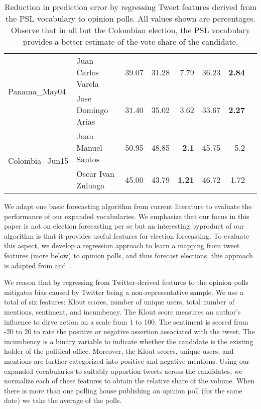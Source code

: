 \begin{table*}[ht]
\begin{tabular}{| l | l | r | r | r | r | r | r |}
		\hline
		\multirow{2}{*}{Panama\_May04} & Juan Carlos Varela & 39.07 &31.28  & 7.79 & 36.23  & \textbf{2.84}\\\cline{2-7}
																	& Jose Domingo Arias  & 31.40 & 35.02  & 3.62  & 33.67  & \textbf{2.27} \\
		\hline 											 
		\multirow{2}{*}{Colombia\_Jun15} & Juan Manuel Santos & 50.95 &48.85  & \textbf{2.1} & 45.75 & 5.2\\\cline{2-7}
																	& Oscar Ivan Zuluaga & 45.00 & 43.79 & \textbf{1.21} & 46.72  & 1.72 \\
		\hline
		\end{tabular}
		\caption{Reduction in prediction error by regressing Tweet
features derived from the PSL vocabulary to opinion polls. All values shown are percentages. Observe that in all but the Colombian election, the PSL vocabulary provides
a better estimate of the vote share of the candidate.}
		\label{table:trackRecord}
	\end{table*}	

We adapt one basic forecasting algorithm from current literature to evaluate the
performance of our expanded vocabularies. We emphasize that our focus in this paper is
not on election forecasting per se but an interesting byproduct of our algorithm is that
it provides useful features for election forecasting.
To evaluate this aspect, we develop
a regression approach
to
learn a mapping
from tweet features (more below) to opinion polls, and thus forecast elections. 
this approach is adapted from \cite{bermingham2011using} and \cite{o2010tweets}.

We reason that by regressing from Twitter-derived features to the opinion polls mitigates bias caused by Twitter being a non-representative sample.
We use a total of six features: Klout scores, number of unique users, total number of mentions, sentiment, and incumbency. The Klout score measures an author's influence to dirve action on a scale from 1 to 100. The sentiment is scored from -20 to 20 to rate the positive or negative assertion associated with the tweet. The incumbency is a binary variable to indicate whether the candidate is the existing holder of the political office. Moreover, the Klout scores, unique users, and mentions are further categorized into positive and negative mentions.
Using our expanded vocabularies to suitably apportion tweets across the candidates,
we normalize each of these features to obtain the relative share of the volume. 
When there is more than one polling house publishing an opinion poll (for the same date) we take the average of the polls. 

